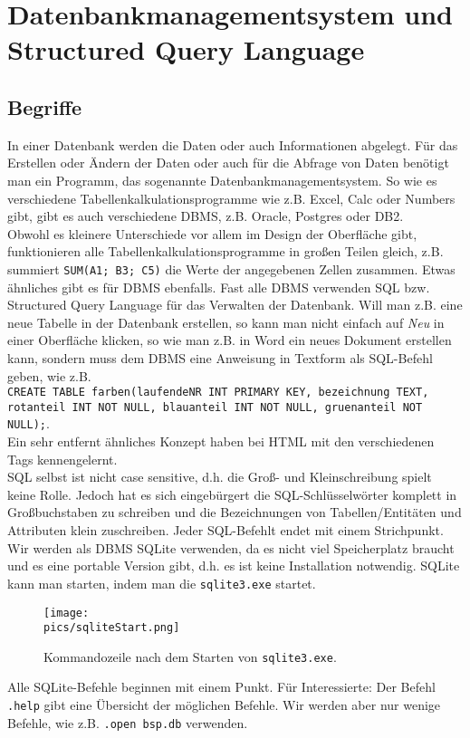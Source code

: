 \section[DBMS und SQL]{Datenbankmanagementsystem und Structured Query Language}
\subsection{Begriffe}
In einer Datenbank werden die Daten oder auch Informationen abgelegt. Für das Erstellen oder Ändern der Daten oder auch für die Abfrage von Daten benötigt man ein Programm, das sogenannte Datenbankmanagementsystem. So wie es verschiedene Tabellenkalkulationsprogramme wie z.B. Excel, Calc oder Numbers gibt, gibt es auch verschiedene DBMS, z.B. Oracle, Postgres oder DB2.\\
Obwohl es kleinere Unterschiede vor allem im Design der Oberfläche gibt, funktionieren alle Tabellenkalkulationsprogramme in großen Teilen gleich, z.B. summiert \lstinline!SUM(A1; B3; C5)! die Werte der angegebenen Zellen zusammen. Etwas ähnliches gibt es für DBMS ebenfalls. Fast alle DBMS verwenden SQL bzw. Structured Query Language für das Verwalten der Datenbank. Will man z.B. eine neue Tabelle in der Datenbank erstellen, so kann man nicht einfach auf \textit{Neu} in einer Oberfläche klicken, so wie man z.B. in Word ein neues Dokument erstellen kann, sondern muss dem DBMS eine Anweisung in Textform als SQL-Befehl geben, wie z.B.\\ \lstinline!CREATE TABLE farben(laufendeNR INT PRIMARY KEY, bezeichnung TEXT,!\\
\lstinline!rotanteil INT NOT NULL, blauanteil INT NOT NULL, gruenanteil NOT NULL);!.\\
Ein sehr entfernt ähnliches Konzept haben bei HTML mit den verschiedenen Tags kennengelernt.\\
SQL selbst ist nicht case sensitive, d.h. die Groß- und Kleinschreibung spielt keine Rolle. Jedoch hat es sich eingebürgert die SQL-Schlüsselwörter komplett in Großbuchstaben zu schreiben und die Bezeichnungen von Tabellen/Entitäten und Attributen klein zuschreiben. Jeder SQL-Befehlt endet mit einem Strichpunkt.\\
Wir werden als DBMS SQLite verwenden, da es nicht viel Speicherplatz braucht und es eine portable Version gibt, d.h. es ist keine Installation notwendig. SQLite kann man starten, indem man die \texttt{sqlite3.exe} startet.\\
\begin{figure}[h]
	\centering
	\texttt{[image: \\pics/sqliteStart.png]}
	\caption*{Kommandozeile nach dem Starten von \texttt{sqlite3.exe}.}
\end{figure}
Alle SQLite-Befehle beginnen mit einem Punkt. Für Interessierte: Der Befehl \lstinline!.help! gibt eine Übersicht der möglichen Befehle. Wir werden aber nur wenige Befehle, wie z.B. \lstinline!.open bsp.db! verwenden.\\